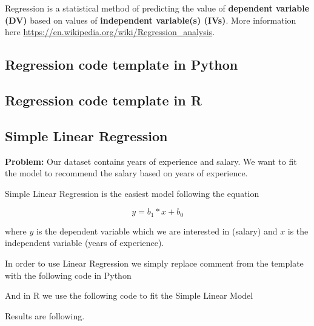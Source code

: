 \documentclass[runningheads,a4paper]{llncs}
\begin{document}
Regression is a statistical method of predicting the value of \textbf{dependent variable (DV)} based on values of \textbf{independent variable(s) (IVs)}. More information here \url{https://en.wikipedia.org/wiki/Regression_analysis}.

\subsection{Regression code template in Python}



\subsection{Regression code template in R}



\subsection{Simple Linear Regression}

\textbf{Problem:} Our dataset contains years of experience and salary. We want to fit the model to recommend the salary based on years of experience. 


Simple Linear Regression is the easiest model following the equation

\begin{equation}
y = b_1 * x + b_0
\end{equation}

where $y$ is the dependent variable which we are interested in (salary) and $x$ is the independent variable (years of experience).

In order to use Linear Regression we simply replace comment from the template with the following code in Python

\lstset{basicstyle=\large,style=R}
 


And in R we use the following code to fit the Simple Linear Model

\lstset{basicstyle=\large,style=R}
 


Results are following.
\end{document}
